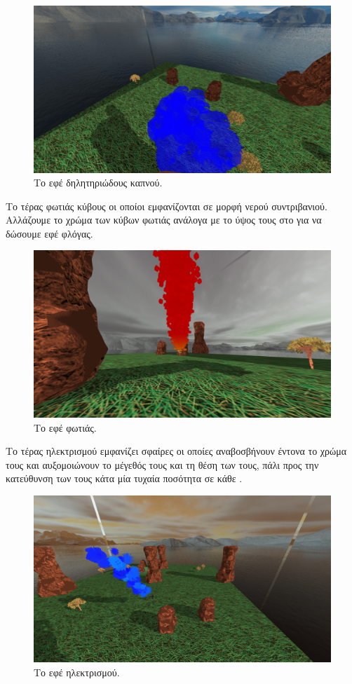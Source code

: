 \documentclass[11pt]{scrartcl} %
\newenvironment{centerimg}[1]%
{%
    \begin{figure}[H]
        #1
    \begin{center}
}%
{%
    \end{center}
    \end{figure}
}
\begin{document}
\begin{centerimg}{\caption{Το εφέ δηλητηριώδους καπνού.}}
    \includegraphics[width=.7\textwidth]{./assets/poison_smoke.png}
\end{centerimg}

Το τέρας φωτιάς  κύβους οι οποίοι εμφανίζονται σε μορφή 
νερού συντριβανιού. Αλλάζουμε το χρώμα των κύβων φωτιάς ανάλογα με το ύψος τους στο 
 για να δώσουμε εφέ φλόγας.

\begin{centerimg}{\caption{Το εφέ φωτιάς.}}
    \includegraphics[width=.7\textwidth]{./assets/fire.png}
\end{centerimg}


Το τέρας ηλεκτρισμού εμφανίζει σφαίρες οι οποίες αναβοσβήνουν έντονα το χρώμα 
τους και αυξομοιώνουν  το μέγεθός τους και τη θέση των  
τους, πάλι προς την κατεύθυνση των  τους κάτα μία τυχαία ποσότητα 
σε κάθε .

\begin{centerimg}{\caption{Το εφέ ηλεκτρισμού.}}
    \includegraphics[width=.7\textwidth]{./assets/electricity.png}
\end{centerimg}
\end{document}
